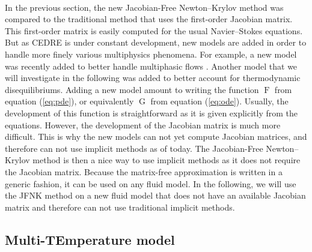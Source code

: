     \paragraph{}
    In the previous section, the new Jacobian-Free Newton--Krylov method was compared to the traditional method that uses the first-order Jacobian matrix.
    This first-order matrix is easily computed for the usual Navier--Stokes equations.
    But as CEDRE is under constant development, new models are added in order to handle more finely various multiphysics phenomena.
    For example, a new model was recently added to better handle multiphasic flows \cite{Cordesse2020}.
    Another model that we will investigate in the following was added to better account for thermodynamic disequilibriums.
    Adding a new model amount to writing the function $\operatorname{F}$ from equation (\ref{eq:pde}), or equivalently $\operatorname{G}$ from equation (\ref{eq:ode}).
    Usually, the development of this function is straightforward as it is given explicitly from the equations.
    However, the development of the Jacobian matrix is much more difficult.
    This is why the new models can not yet compute Jacobian matrices, and therefore can not use implicit methods as of today.
    The Jacobian-Free Newton--Krylov method is then a nice way to use implicit methods as it does not require the Jacobian matrix.
    Because the matrix-free approximation is written in a generic fashion, it can be used on any fluid model.
    In the following, we will use the JFNK method on a new fluid model that does not have an available Jacobian matrix and therefore can not use traditional implicit methods.


    \subsection{Multi-TEmperature model}

